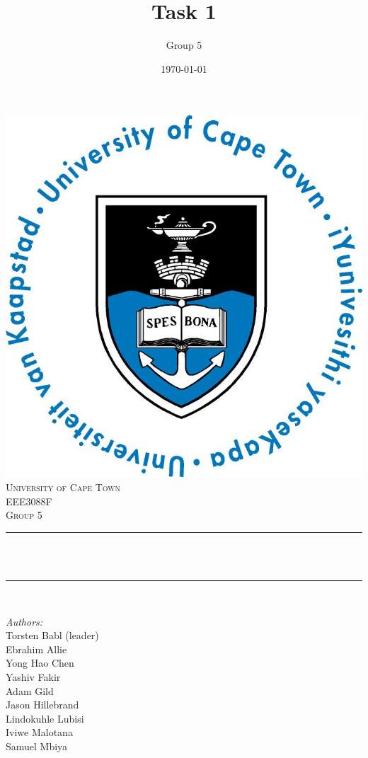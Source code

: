 \documentclass[12pt]{article}
\title{Task 1}								%
\author{Group 5}								%
\date{\today}											%
\makeatletter
\let\thetitle\@title
\makeatother
\begin{document}

\begin{titlepage}
	\centering
    \vspace*{0.5 cm}
    \includegraphics[scale = 0.75]{UCT.jpg}\\[1.0 cm]	%
    \textsc{\LARGE University of Cape Town}\\[1.0 cm]	%
	\textsc{\Large EEE3088F}\\[0.5 cm]				%
	\textsc{\large Group 5}\\[0.5 cm]				%
	\rule{\linewidth}{0.2 mm} \\[0.4 cm]
	{ \huge \bfseries \thetitle}\\
	\rule{\linewidth}{0.2 mm} \\[0.5 cm]
	
	\begin{minipage}{0.4\textwidth}
		\begin{flushleft} \large
			\emph{Authors:}\\
      Torsten Babl (leader)\\
      Ebrahim Allie\\
      Yong Hao Chen\\
      Yashiv Fakir\\
      Adam Gild\\
      Jason Hillebrand\\
      Lindokuhle Lubisi\\
      Iviwe Malotana\\
      Samuel Mbiya
      

\end{flushleft}
\end{minipage}
\end{titlepage}
\end{document}
